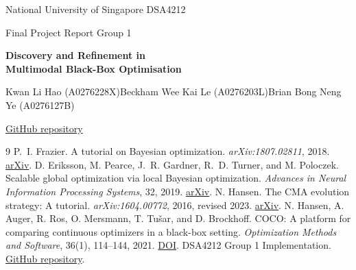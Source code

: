 \documentclass[10pt,a4paper,oneside,openany]{book}
\newcommand{\repotree}{https://github.com/bbny27/DSA4212-G1/tree/e2863a9c4a7d237938771be24634e8711d109616}
\begin{document}
\thispagestyle{plain}
\noindent National University of Singapore \hfill DSA4212 \par
\noindent Final Project Report \hfill Group 1\par
\vspace{1.1em}
\begin{center}
{\LARGE\bfseries Discovery and Refinement in\\[0.2em]
Multimodal Black-Box Optimisation\par}
\vspace{0.55em}
\vspace{0.8em}
Kwan Li Hao (A0276228X)\quad Beckham Wee Kai Le (A0276203L)\quad Brian Bong Neng Ye (A0276127B)
\par\smallskip
\href{https://github.com/bbny27/DSA4212-G1}{GitHub repository}
\par
\end{center}
\vspace{0.4em}










\begingroup
\small
{}
\renewcommand{\bibname}{References}
\begin{thebibliography}{9}\setlength{\itemsep}{2pt}
P.~I. Frazier. A tutorial on Bayesian optimization.
\emph{arXiv:1807.02811}, 2018.
\href{https://arxiv.org/abs/1807.02811}{arXiv}.
D. Eriksson, M. Pearce, J.~R. Gardner, R.~D. Turner, and M. Poloczek.
Scalable global optimization via local Bayesian optimization.
\emph{Advances in Neural Information Processing Systems}, 32, 2019.
\href{https://arxiv.org/abs/1910.01739}{arXiv}.
N. Hansen. The CMA evolution strategy: A tutorial.
\emph{arXiv:1604.00772}, 2016, revised 2023.
\href{https://arxiv.org/abs/1604.00772}{arXiv}.
N. Hansen, A. Auger, R. Ros, O. Mersmann, T. Tušar, and D. Brockhoff.
COCO: A platform for comparing continuous optimizers in a black-box setting.
\emph{Optimization Methods and Software}, 36(1), 114--144, 2021.
\href{https://doi.org/10.1080/10556788.2020.1808977}{DOI}.
DSA4212 Group 1 Implementation.
\href{\repotree}{GitHub repository}.
\end{thebibliography}
\endgroup
\end{document}
